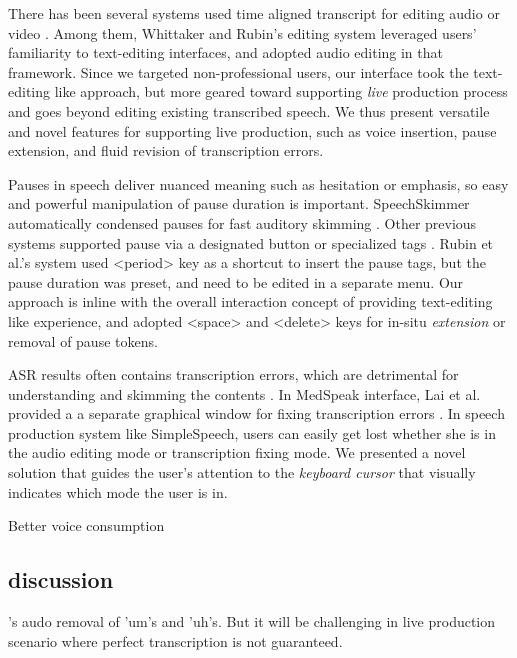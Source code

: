 There has been several systems used time aligned transcript for editing audio \cite{yoon, whittaker_semantic, rubin} or video \cite{casares, Berthouzoz:2012}. Among them, Whittaker and Rubin's editing system leveraged users' familiarity to text-editing interfaces, and adopted audio editing in that framework. Since we targeted non-professional users, our interface took the text-editing like approach, but more geared toward supporting \emph{live} production process and goes beyond editing existing transcribed speech. We thus present versatile and novel features for supporting live production, such as voice insertion, pause extension, and fluid revision of transcription errors.

Pauses in speech deliver nuanced meaning such as hesitation or emphasis, so easy and powerful manipulation of pause duration is important. SpeechSkimmer automatically condensed pauses for fast auditory skimming \cite{arons:1993}. Other previous systems supported pause via a designated button \cite{Berthouzoz:2012} or specialized tags \cite{rubin}. Rubin et al.'s system used <period> key as a shortcut to insert the pause tags, but the pause duration was preset, and need to be edited in a separate menu. Our approach is inline with the overall interaction concept of providing text-editing like experience, and adopted <space> and <delete> keys for in-situ \emph{extension} or removal of pause tokens.

ASR results often contains transcription errors, which are detrimental for understanding and skimming the contents \cite{halverson1999beauty}. In MedSpeak interface, Lai et al. provided a a separate graphical window for fixing transcription errors \cite{Lai:1997}. In speech production system like SimpleSpeech, users can easily get lost whether she is in the audio editing mode or transcription fixing mode. We presented a novel solution that guides the user's attention to the \emph{keyboard cursor} that visually indicates which mode the user is in.


Better voice consumption\cite{Whittaker:1994,Stifelman:2001,Lai:1997,yoon}



\subsection{discussion}
\cite{Berthouzoz:2012} 's audo removal of 'um's and 'uh's. But it will be challenging in live production scenario where perfect transcription is not guaranteed.

